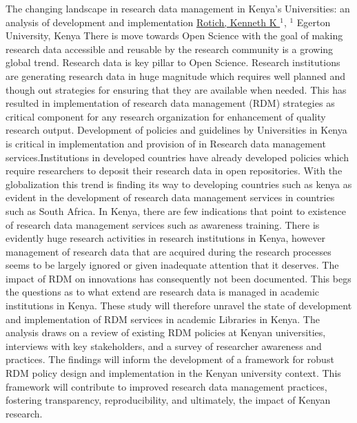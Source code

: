 
    \begin{abstract_online}{The changing landscape in research data management in Kenya’s Universities: an analysis of development and implementation }{%
        \underline{Rotich, Kenneth K }$^{1}$,{%
        }{%
        $^1$ Egerton University, Kenya}
            }
 	There is move towards Open Science with the goal of making research data accessible and reusable by the research community is a growing global trend. Research data is key pillar to Open Science. Research institutions are generating research data in huge magnitude which requires well planned and though out strategies for ensuring that they are available when needed. This has resulted in implementation of research data management (RDM) strategies as critical component for any research organization for enhancement of quality research output. Development of policies and guidelines by Universities in Kenya is critical in implementation and provision of in Research data management services.Institutions in developed countries have already developed policies which require researchers to deposit their research data in open repositories. With the globalization this trend is finding its way to developing countries such as kenya as evident in the development of research data management services in countries such as South Africa. In Kenya, there are few indications that point to existence of research data management services such as awareness training. There is evidently huge research activities in research institutions in Kenya, however management of research data that are acquired during the research processes seems to be largely ignored or given inadequate attention that it deserves. The impact of RDM on innovations has consequently not been documented. This begs the questions as to what extend are research data is managed in academic institutions in Kenya. These study will therefore unravel the state of development and implementation of RDM services in academic Libraries in Kenya. The analysis draws on a review of existing RDM policies at Kenyan universities, interviews with key stakeholders, and a survey of researcher awareness and practices. The findings will inform the development of a framework for robust RDM policy design and implementation in the Kenyan university context. This framework will contribute to improved research data management practices, fostering transparency, reproducibility, and ultimately, the impact of Kenyan research.
    \end{abstract_online}
    
